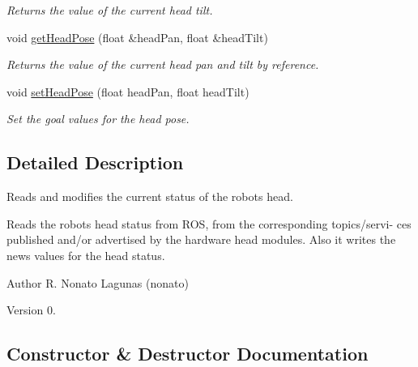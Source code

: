 \begin{DoxyCompactItemize}
\begin{DoxyCompactList}\small\item\em Returns the value of the current head tilt. \end{DoxyCompactList}\item 
void \hyperlink{class_head_status_a45af631cd9ae427d7ba3f99e83069e14}{get\+Head\+Pose} (float \&head\+Pan, float \&head\+Tilt)
\begin{DoxyCompactList}\small\item\em Returns the value of the current head pan and tilt by reference. \end{DoxyCompactList}\item 
void \hyperlink{class_head_status_a1b78aae85199df608c09f748f25dae75}{set\+Head\+Pose} (float head\+Pan, float head\+Tilt)
\begin{DoxyCompactList}\small\item\em Set the goal values for the head pose. \end{DoxyCompactList}\end{DoxyCompactItemize}


\subsection{Detailed Description}
Reads and modifies the current status of the robot\textquotesingle{}s head. 

Reads the robot\textquotesingle{}s head status from R\+OS, from the corresponding topics/servi-\/ ces published and/or advertised by the hardware head modules. Also it writes the news values for the head status.

\begin{DoxyAuthor}{Author}
R. Nonato Lagunas (nonato) 
\end{DoxyAuthor}
\begin{DoxyVersion}{Version}
0. 
\end{DoxyVersion}


\subsection{Constructor \& Destructor Documentation}
